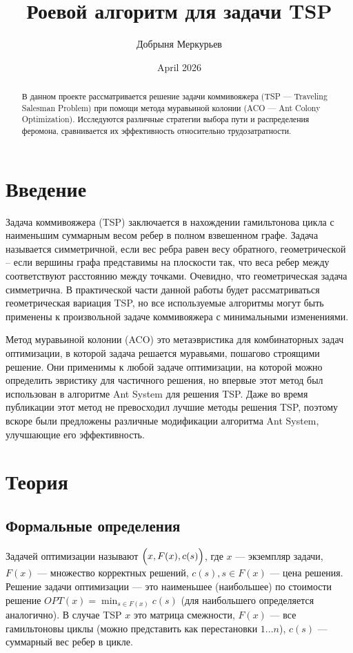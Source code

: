 \documentclass{article}
\title{Роевой алгоритм для задачи TSP}
\author{Добрыня Меркурьев}
\date{April 2026}
\begin{document}
\maketitle

\begin{abstract}
    В данном проекте рассматривается решение задачи коммивояжера (TSP --- Traveling Salesman Problem) при помощи метода муравьиной колонии (ACO --- Ant Colony Optimization). Исследуются различные стратегии выбора пути и распределения феромона, сравнивается их эффективность относительно трудозатратности.
\end{abstract}

\section{Введение}
Задача коммивояжера (TSP) заключается в нахождении гамильтонова цикла с наименьшим суммарным весом ребер в полном взвешенном графе. Задача называется симметричной, если вес ребра равен весу обратного, геометрической -- если вершины графа представимы на плоскости так, что веса ребер между соответствуют расстоянию между точками. Очевидно, что геометрическая задача симметрична. В практической части данной работы будет рассматриваться геометрическая вариация TSP, но все используемые алгоритмы могут быть применены к произвольной задаче коммивояжера с минимальными изменениями.

Метод муравьиной колонии (ACO) это метаэвристика для комбинаторных задач оптимизации, в которой задача решается муравьями, пошагово строящими решение. Они применимы к любой задаче оптимизации, на которой можно определить эвристику для частичного решения, но впервые этот метод был использован в алгоритме Ant System для решения TSP. \cite{AS} Даже во время публикации этот метод не превосходил лучшие методы решения TSP, поэтому вскоре были предложены различные модификации алгоритма Ant System, улучшающие его эффективность.


\section{Теория}
\subsection{Формальные определения}

Задачей оптимизации называют $\Bigl(x, F(x), c(s)\Bigr)$, где $x$ --- экземпляр задачи, $F(x)$ --- множество корректных решений, $c(s), s \in F(x)$ --- цена решения. Решение задачи оптимизации --- это наименьшее (наибольшее) по стоимости решение $OPT(x)=\min_{s\in F(x)} c(s)$ (для наибольшего определяется аналогично). В случае TSP $x$ это матрица смежности, $F(x)$ --- все гамильтоновы циклы (можно представить как перестановки $1...n$), $c(s)$ --- суммарный вес ребер в цикле. 
\end{document}
